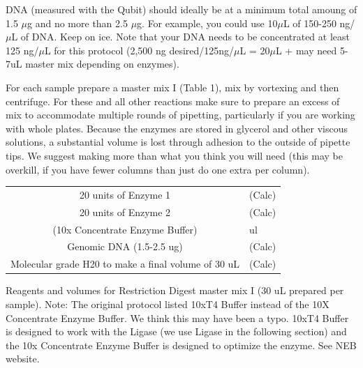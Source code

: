 \documentclass[11pt, oneside]{article}
\begin{document}
DNA (measured with the Qubit) should ideally be at a minimum total amoung of 1.5 $\mu$g and no more than 2.5 $\mu$g. For example, you could use 10$\mu$L of 150-250 ng/$\mu$L of DNA.  Keep on ice.  Note that your DNA needs to be concentrated at least 125 ng/$\mu$L for this protocol (2,500 ng desired/125ng/$\mu$L = 20$\mu$L + may need 5-7uL master mix depending on enzymes).

For each sample prepare a master mix I (Table 1), mix by vortexing and then centrifuge. For these and all other reactions make sure to prepare an excess of mix to accommodate multiple rounds of pipetting, particularly if you are working with whole plates. Because the enzymes are stored in glycerol and other viscous solutions, a substantial volume is lost through adhesion to the outside of pipette tips. We suggest making more than what you think you will need (this may be overkill, if you have fewer columns than just do one extra per column).


			\begin{table}[h]
				\centering
				\begin{tabular}{ | c | >{\centering\arraybackslash} m{10em} |}
					\hline
					\cellcolor{gray}{\bf Reagent} & \cellcolor{gray}{\bf Number of samples 1X (uL)}  \\
					\hline
					20 units of Enzyme 1 & (Calc) \\
					20 units of Enzyme 2 & (Calc) \\
					(10x Concentrate Enzyme Buffer) & 3 ul\\
					Genomic DNA (1.5-2.5 ug) & (Calc) \\
					Molecular grade H20 to make a final volume of 30 uL & (Calc) \\
					\hline
		
				\end{tabular}
			\end{table}

			 Reagents and volumes for Restriction Digest master mix I (30 uL prepared per sample). Note: The original protocol listed 10xT4 Buffer instead of the 10X Concentrate Enzyme Buffer. We think this may have been a typo. 10xT4 Buffer is designed to work with the Ligase (we use Ligase in the following section) and the 10x Concentrate Enzyme Buffer is designed to optimize the enzyme.  See NEB website.
\end{document}
